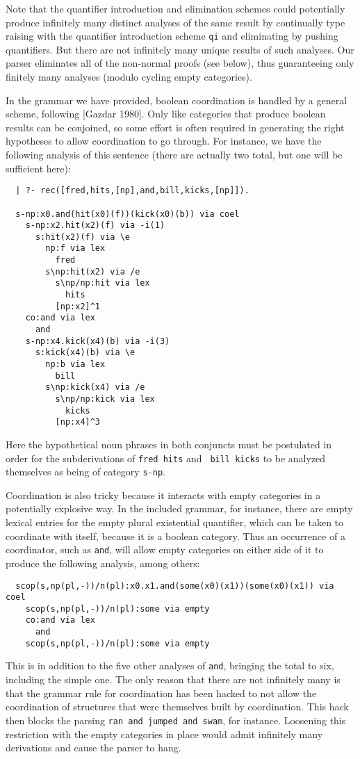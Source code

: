 %
Note that the quantifier introduction and elimination schemes could
potentially produce infinitely many distinct analyses of the same
result by continually type raising with the quantifier introduction
scheme {\tt qi} and eliminating by pushing quantifiers.  But there are
not infinitely many unique results of such analyses.  Our parser
eliminates all of the non-normal proofs (see below), thus guaranteeing
only finitely many analyses (modulo cycling empty categories).



In the grammar we have provided, boolean coordination is handled by a
general scheme, following [Gazdar 1980].  Only like categories that
produce boolean results can be conjoined, so some effort is often
required in generating the right hypotheses to allow coordination to
go through.  For instance, we have the following analysis of this
sentence (there are actually two total, but one will be sufficient
here):
%
\begin{verbatim}
  | ?- rec([fred,hits,[np],and,bill,kicks,[np]]).
  
  s-np:x0.and(hit(x0)(f))(kick(x0)(b)) via coel
    s-np:x2.hit(x2)(f) via -i(1)
      s:hit(x2)(f) via \e
        np:f via lex
          fred
        s\np:hit(x2) via /e
          s\np/np:hit via lex
            hits
          [np:x2]^1
    co:and via lex
      and
    s-np:x4.kick(x4)(b) via -i(3)
      s:kick(x4)(b) via \e
        np:b via lex
          bill
        s\np:kick(x4) via /e
          s\np/np:kick via lex
            kicks
          [np:x4]^3 
\end{verbatim}
%
Here the hypothetical noun phrases in both conjuncts must be
postulated in order for the subderivations of {\tt fred hits} and {\tt
bill kicks} to be analyzed themselves as being of category {\tt s-np}.

Coordination is also tricky because it interacts with empty
categories in a potentially explosive way.  In the included grammar,
for instance, there are empty lexical entries for the empty plural
existential quantifier, which can be taken to coordinate with itself,
because it is a boolean category.  Thus an occurrence of a coordinator,
such as {\tt and}, will allow empty categories on either side of it to
produce the following analysis, among others:
%
\begin{verbatim}
  scop(s,np(pl,-))/n(pl):x0.x1.and(some(x0)(x1))(some(x0)(x1)) via coel
    scop(s,np(pl,-))/n(pl):some via empty
    co:and via lex
      and
    scop(s,np(pl,-))/n(pl):some via empty
\end{verbatim}
%
This is in addition to the five other analyses of {\tt and}, bringing
the total to six, including the simple one.  The only reason that
there are not infinitely many is that the grammar rule for
coordination has been hacked to not allow the coordination of
structures that were themselves built by coordination.  This hack then
blocks the parsing {\tt ran and jumped and swam}, for instance.
Loosening this restriction with the empty categories in place would
admit infinitely many derivations and cause the parser to hang.




